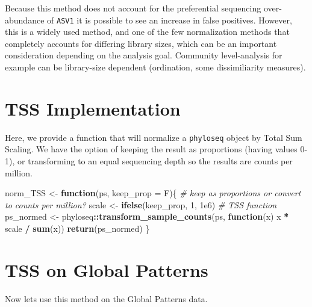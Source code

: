 \documentclass[
]{book}
\newenvironment{Shaded}{\begin{snugshade}}{\end{snugshade}}
\newcommand{\CommentTok}[1]{\textcolor[rgb]{0.56,0.35,0.01}{\textit{#1}}}
\newcommand{\ControlFlowTok}[1]{\textcolor[rgb]{0.13,0.29,0.53}{\textbf{#1}}}
\newcommand{\DataTypeTok}[1]{\textcolor[rgb]{0.13,0.29,0.53}{#1}}
\newcommand{\DecValTok}[1]{\textcolor[rgb]{0.00,0.00,0.81}{#1}}
\newcommand{\FloatTok}[1]{\textcolor[rgb]{0.00,0.00,0.81}{#1}}
\newcommand{\KeywordTok}[1]{\textcolor[rgb]{0.13,0.29,0.53}{\textbf{#1}}}
\newcommand{\NormalTok}[1]{#1}
\newcommand{\OperatorTok}[1]{\textcolor[rgb]{0.81,0.36,0.00}{\textbf{#1}}}
\newcommand{\StringTok}[1]{\textcolor[rgb]{0.31,0.60,0.02}{#1}}
\begin{document}
Because this method does not account for the preferential sequencing over-abundance of \texttt{ASV1} it is possible to see an increase in false positives. However, this is a widely used method, and one of the few normalization methods that completely accounts for differing library sizes, which can be an important consideration depending on the analysis goal. Community level-analysis for example can be library-size dependent (ordination, some dissimiliarity measures).

\hypertarget{tss-implementation}{%
\section{TSS Implementation}\label{tss-implementation}}

Here, we provide a function that will normalize a \texttt{phyloseq} object by Total Sum Scaling. We have the option of keeping the result as proportions (having values 0-1), or transforming to an equal sequencing depth so the results are counts per million.

\begin{Shaded}
\begin{Highlighting}[]
\NormalTok{norm\_TSS \textless{}{-}}\StringTok{ }\ControlFlowTok{function}\NormalTok{(ps, }\DataTypeTok{keep\_prop =}\NormalTok{ F)\{}
    \CommentTok{\# keep as proportions or convert to counts per million?}
\NormalTok{    scale \textless{}{-}}\StringTok{ }\KeywordTok{ifelse}\NormalTok{(keep\_prop, }\DecValTok{1}\NormalTok{, }\FloatTok{1e6}\NormalTok{)}
    \CommentTok{\# TSS function}
\NormalTok{    ps\_normed \textless{}{-}}\StringTok{ }\NormalTok{phyloseq}\OperatorTok{::}\KeywordTok{transform\_sample\_counts}\NormalTok{(ps, }\ControlFlowTok{function}\NormalTok{(x) x }\OperatorTok{*}\StringTok{ }\NormalTok{scale }\OperatorTok{/}\StringTok{ }\KeywordTok{sum}\NormalTok{(x))}
    \KeywordTok{return}\NormalTok{(ps\_normed)}
\NormalTok{\}}
\end{Highlighting}
\end{Shaded}

\hypertarget{tss-on-global-patterns}{%
\section{TSS on Global Patterns}\label{tss-on-global-patterns}}

Now lets use this method on the Global Patterns data.

\begin{Shaded}
\end{Shaded}
\end{document}

